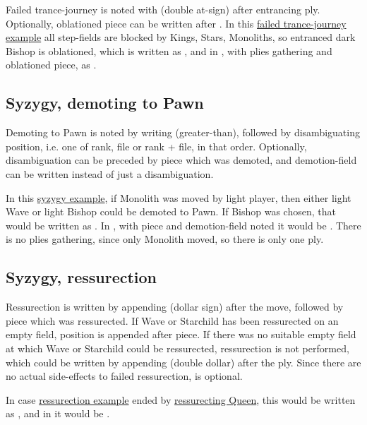 Failed trance-journey is noted with  (double at-sign) after entrancing ply. Optionally, oblationed
piece can be written after . In this
\hyperref[fig:scn_o_21_trance_journey_failed]{failed trance-journey example} all step-fields are blocked by
Kings, Stars, Monoliths, so entranced dark Bishop is oblationed, which is written as ,
and in , with plies gathering and oblationed piece, as .

\subsection*{Syzygy, demoting to Pawn}
\label{sec:Appendix/Syzygy, demoting to Pawn}

Demoting to Pawn is noted by writing \alg{>} (greater-than), followed by disambiguating position, i.e.
one of rank, file or rank + file, in that order. Optionally, disambiguation can be preceded by piece which
was demoted, and demotion-field can be written instead of just a disambiguation.

In this \hyperref[fig:scn_d_15_syzygy_2_stars_init]{syzygy example}, if Monolith was moved by light player,
then either light Wave or light Bishop could be demoted to Pawn. If Bishop was chosen, that would be written
as . In , with piece and demotion-field noted it would be . There
is no plies gathering, since only Monolith moved, so there is only one ply.

\subsection*{Syzygy, ressurection}
\label{sec:Appendix/Syzygy, ressurection}

Ressurection is written by appending \alg{\$} (dollar sign) after the move, followed by piece which was
ressurected. If Wave or Starchild has been ressurected on an empty field, position is appended after piece.
If there was no suitable empty field at which Wave or Starchild could be ressurected, ressurection is not
performed, which could be written by appending \alg{\$\$} (double dollar) after the ply. Since there are
no actual side-effects to failed ressurection, \alg{\$\$} is optional.

In case \hyperref[fig:scn_o_23_syzygy_starchild_init]{ressurection example} ended by
\hyperref[fig:scn_o_24_syzygy_starchild_end]{ressurecting Queen}, this would be written as ,
and in  it would be .

